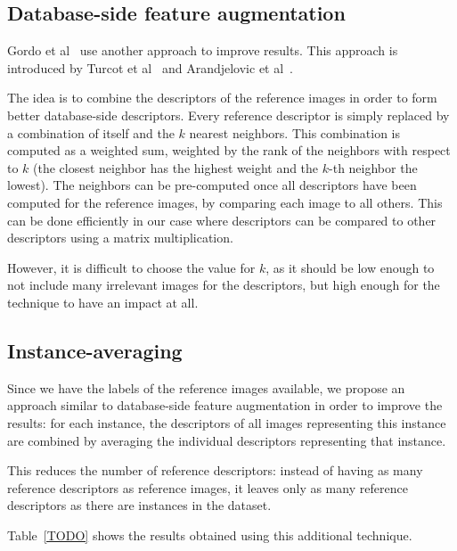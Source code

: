 \subsection{Database-side feature augmentation}
Gordo et al~\cite{gordo_end--end_2016} use another
approach to improve results. This approach is introduced
by Turcot et al~\cite{turcot_better_2009} and
Arandjelovic et al~\cite{arandjelovic_three_2012}.

The idea is to combine the descriptors of the reference
images in order to form better database-side descriptors.
Every reference descriptor is simply replaced by a
combination of itself and the $k$ nearest neighbors.
This combination is computed as a weighted sum, weighted
by the rank of the neighbors with respect to $k$ (the
closest neighbor has the highest weight and the $k$-th
neighbor the lowest).
The neighbors can be pre-computed once all descriptors
have been computed for the reference images, by comparing
each image to all others. This can be done efficiently
in our case where descriptors can be compared to other
descriptors using a matrix multiplication.

However, it is difficult to choose the value for $k$, as
it should be low enough to not include many irrelevant
images for the descriptors, but high enough for the
technique to have an impact at all.

\subsection{Instance-averaging}
Since we have the labels of the reference images
available, we propose an approach similar to
database-side feature augmentation in order to
improve the results: for each instance, the descriptors
of all images representing this instance are combined
by averaging the individual descriptors representing
that instance.

This reduces the number of reference descriptors:
instead of having as many reference descriptors as
reference images, it leaves only as many reference
descriptors as there are instances in the dataset.

Table~\ref{TODO} shows the results obtained
using this additional technique. %
